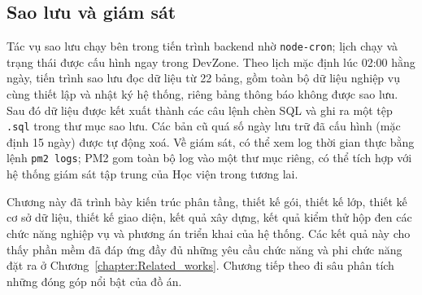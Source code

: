 \documentclass[../DoAn.tex]{subfiles}
\begin{document}
\subsection{Sao lưu và giám sát}
\label{subsection:4.5.4}

Tác vụ sao lưu chạy bên trong tiến trình backend nhờ \texttt{node-cron}; lịch chạy và trạng thái được cấu hình ngay trong DevZone.
Theo lịch mặc định lúc 02:00 hằng ngày, tiến trình sao lưu đọc dữ liệu từ 22 bảng, gồm toàn bộ dữ liệu nghiệp vụ cùng thiết lập và nhật ký hệ thống, riêng bảng thông báo không được sao lưu. Sau đó dữ liệu được kết xuất thành các câu lệnh chèn SQL và ghi ra một tệp \texttt{.sql} trong thư mục sao lưu.
Các bản cũ quá số ngày lưu trữ đã cấu hình (mặc định 15 ngày) được tự động xoá.
Về giám sát, có thể xem log thời gian thực bằng lệnh \texttt{pm2 logs}; PM2 gom toàn bộ log vào một thư mục riêng, có thể tích hợp với hệ thống giám sát tập trung của Học viện trong tương lai.

Chương này đã trình bày kiến trúc phân tầng, thiết kế gói, thiết kế lớp, thiết kế cơ sở dữ liệu, thiết kế giao diện, kết quả xây dựng, kết quả kiểm thử hộp đen các chức năng nghiệp vụ và phương án triển khai của hệ thống.
Các kết quả này cho thấy phần mềm đã đáp ứng đầy đủ những yêu cầu chức năng và phi chức năng đặt ra ở Chương~\ref{chapter:Related_works}.
Chương tiếp theo đi sâu phân tích những đóng góp nổi bật của đồ án.
\end{document}
